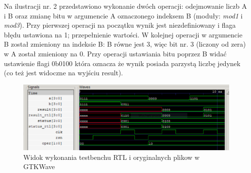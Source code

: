 \noindent
Na ilustracji nr. 2 przedstawiono wykonanie dwóch operacji: odejmowanie liczb A i B oraz zmianę bitu w argumencie A oznaczonego indeksem B (moduły: \emph{mod1} i \emph{mod3}). Przy pierwszej operacji na początku wynik jest niezdefiniowany i flaga błędu ustawiona na 1; przepełnienie wartości. W kolejnej operacji w argumencie B został zmieniony na indeksie B: B równe jest 3, więc bit nr. 3 (liczony od zera) w A został zmieniony na 0. Przy operacji ustawiania bitu poprzez B widać ustawienie flagi 0b0100 która oznacza że wynik posiada parzystą liczbę jedynek (co też jest widoczne na wyjściu result).

\begin{figure}[h!]
	\centering
	\includegraphics[width=1\linewidth]{img1}
	\caption{Widok wykonania testbenchu RTL i oryginalnych plikow w GTKWave}
	\label{fig:img1}
\end{figure}

